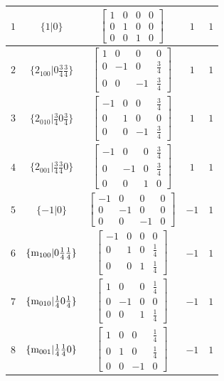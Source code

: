 \documentclass[fleqn,8pt]{jsarticle}
\begin{document}
\begin{longtable}{ccccc}
$ 1 $ & $ \{1|0\} $ & $ \begin{bmatrix} 1 & 0 & 0 & 0 \\ 0 & 1 & 0 & 0 \\ 0 & 0 & 1 & 0 \end{bmatrix} $ & $ 1 $ & $ 1 $ \\ \hline
$ 2 $ & $ \{2{}_{100}|0 \frac{3}{4} \frac{3}{4}\} $ & $ \begin{bmatrix} 1 & 0 & 0 & 0 \\ 0 & -1 & 0 & \frac{3}{4} \\ 0 & 0 & -1 & \frac{3}{4} \end{bmatrix} $ & $ 1 $ & $ 1 $ \\ \hline
$ 3 $ & $ \{2{}_{010}|\frac{3}{4} 0 \frac{3}{4}\} $ & $ \begin{bmatrix} -1 & 0 & 0 & \frac{3}{4} \\ 0 & 1 & 0 & 0 \\ 0 & 0 & -1 & \frac{3}{4} \end{bmatrix} $ & $ 1 $ & $ 1 $ \\ \hline
$ 4 $ & $ \{2{}_{001}|\frac{3}{4} \frac{3}{4} 0\} $ & $ \begin{bmatrix} -1 & 0 & 0 & \frac{3}{4} \\ 0 & -1 & 0 & \frac{3}{4} \\ 0 & 0 & 1 & 0 \end{bmatrix} $ & $ 1 $ & $ 1 $ \\ \hline
$ 5 $ & $ \{-1|0\} $ & $ \begin{bmatrix} -1 & 0 & 0 & 0 \\ 0 & -1 & 0 & 0 \\ 0 & 0 & -1 & 0 \end{bmatrix} $ & $ -1 $ & $ 1 $ \\ \hline
$ 6 $ & $ \{{\rm m}_{100}|0 \frac{1}{4} \frac{1}{4}\} $ & $ \begin{bmatrix} -1 & 0 & 0 & 0 \\ 0 & 1 & 0 & \frac{1}{4} \\ 0 & 0 & 1 & \frac{1}{4} \end{bmatrix} $ & $ -1 $ & $ 1 $ \\ \hline
$ 7 $ & $ \{{\rm m}_{010}|\frac{1}{4} 0 \frac{1}{4}\} $ & $ \begin{bmatrix} 1 & 0 & 0 & \frac{1}{4} \\ 0 & -1 & 0 & 0 \\ 0 & 0 & 1 & \frac{1}{4} \end{bmatrix} $ & $ -1 $ & $ 1 $ \\ \hline
$ 8 $ & $ \{{\rm m}_{001}|\frac{1}{4} \frac{1}{4} 0\} $ & $ \begin{bmatrix} 1 & 0 & 0 & \frac{1}{4} \\ 0 & 1 & 0 & \frac{1}{4} \\ 0 & 0 & -1 & 0 \end{bmatrix} $ & $ -1 $ & $ 1 $ \\ \hline

\end{longtable}
\end{document}
